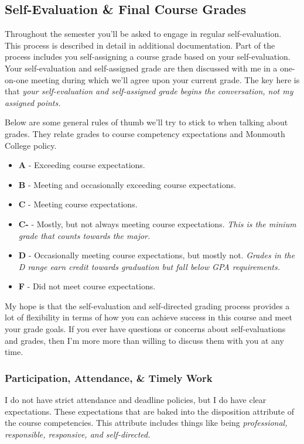\documentclass[10pt]{article}
\begin{document}
\subsection{Self-Evaluation \& Final Course Grades}

Throughout the semester you'll be asked to engage in regular self-evaluation. This process is described in detail in additional documentation. Part of the process includes you self-assigning a course grade based on your self-evaluation. Your self-evaluation and self-assigned grade are then discussed with me in a one-on-one meeting during which we'll agree upon your current grade. The key here is that \textit{your self-evaluation and self-assigned grade begins the conversation, not my assigned points.}

Below are some general rules of thumb we'll try to stick to when talking about grades. They relate grades to course competency expectations and Monmouth College policy.
\begin{itemize}
  \item \textbf{A} - Exceeding course expectations.
  \item \textbf{B} - Meeting and occasionally exceeding course expectations.
  \item \textbf{C} - Meeting course expectations.
  \item \textbf{C-} - Mostly, but not always meeting course expectations. \textit{This is the minium grade that counts towards the major.}
  \item \textbf{D} - Occasionally meeting course expectations, but mostly not. \textit{Grades in the D range earn credit towards graduation but fall below GPA requirements.}
  \item \textbf{F} - Did not meet course expectations.
\end{itemize}

My hope is that the self-evaluation and self-directed grading process provides a lot of flexibility in terms of how you can achieve success in this course and meet your grade goals. If you ever have questions or concerns about self-evaluations and grades, then I'm more more than willing to discuss them with you at any time.

\subsubsection{Participation, Attendance, \& Timely Work}

I do not have strict attendance and deadline policies, but I do have clear expectations. These expectations that are baked into the disposition attribute of the course competencies. This attribute includes things like being \textit{professional, responsible, responsive, and self-directed.}
\end{document}
